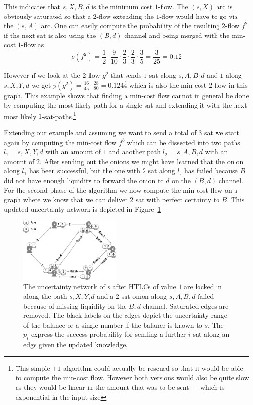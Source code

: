 \documentclass[10pt,twocolumn]{article}
\begin{document}
This indicates that $s,X,B,d$ is the minimum cost $1$-flow.
The $(s,X)$ arc is obviously saturated so that a $2$-flow extending the $1$-flow would have to go via the $(s,A)$ arc.
One can easily compute the probability of the resulting $2$-flow $f^2$ if the next sat is also using the $(B,d)$ channel and being merged with the min-cost $1$-flow as
\[
p(f^2) = \frac{1}{2}\cdot \frac{9}{10}\cdot \frac{2}{3}\cdot \frac{2}{3}\cdot \frac{3}{5} = \frac{3}{25}=0.12
\]

However if we look at the $2$-flow $g^2$ that sends $1$ sat along $s,A,B,d$ and $1$ along $s,X,Y,d$ we get $p(g^2)=\frac{16}{45}\cdot\frac{28}{80} = 0.124\overline{4}$
which is also the min-cost $2$-flow in this graph.
This example shows that finding a min-cost flow cannot in general be done  by computing the most likely path for a single sat and extending it with the next most likely $1$-sat-paths.\footnote{This simple $+1$-algorithm could actually be rescued so that it would be able to compute the min-cost flow. However both versions would also be quite slow as they would be linear in the amount that was to be sent --- which is exponential in the input size}

Extending our example and assuming we want to send a total of 3 sat we start again by computing the min-cost flow $f^3$ which can be dissected into two paths $l_1= s,X,Y,d$ with an amount of $1$ and another path $l_2=s,A,B,d$ with an amount of $2$.
After sending out the onions we might have learned that the onion along $l_1$ has been successful, but the one with $2$ sat along $l_2$ has failed because $B$ did not have enough liquidity to forward the onion to $d$ on the $(B,d)$ channel.
For the second phase of the algorithm we now compute the min-cost flow on a graph where we know that we can deliver 2 sat with perfect certainty to $B$.
This updated uncertainty network is depicted in Figure~\ref{fig:round2}
\begin{figure}[htpb]
  \center
  \includegraphics[width=0.45\textwidth]{img/round2.png}
\caption{The uncertainty network of $s$ after HTLCs of value $1$ are locked in along the path $s,X,Y,d$ and a 2-sat onion along $s,A,B,d$ failed because of missing liquidity on the $B,d$ channel. Saturated edges are removed. The black labels on the edges depict the uncertainty range of the balance or a single number if the balance is known to $s$. The $p_i$ express the success probability for sending a further $i$ sat along an edge given the updated knowledge. }

  \label{fig:round2}
\end{figure}
\end{document}
